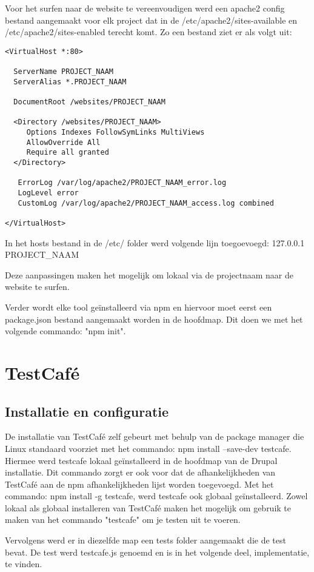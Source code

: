 Voor het surfen naar de website te vereenvoudigen werd een apache2 config bestand aangemaakt voor elk project dat in de /etc/apache2/sites-available en /etc/apache2/sites-enabled terecht komt. Zo een bestand ziet er als volgt uit:  

\begin{lstlisting}
<VirtualHost *:80>

  ServerName PROJECT_NAAM
  ServerAlias *.PROJECT_NAAM

  DocumentRoot /websites/PROJECT_NAAM

  <Directory /websites/PROJECT_NAAM>
     Options Indexes FollowSymLinks MultiViews
     AllowOverride All
     Require all granted
  </Directory>

   ErrorLog /var/log/apache2/PROJECT_NAAM_error.log
   LogLevel error
   CustomLog /var/log/apache2/PROJECT_NAAM_access.log combined
   
</VirtualHost>
\end{lstlisting}

In het hosts bestand in de /etc/ folder werd volgende lijn toegoevoegd: 127.0.0.1   PROJECT\_NAAM

Deze aanpassingen maken het mogelijk om lokaal via de projectnaam naar de website te surfen.

Verder wordt elke tool geïnstalleerd via npm en hiervoor moet eerst een package.json bestand aangemaakt worden in de hoofdmap. Dit doen we met het volgende commando: "npm init".

\section{TestCafé}

\subsection{Installatie en configuratie}
De installatie van TestCafé zelf gebeurt met behulp van de package manager die Linux standaard voorziet met het commando: npm install --save-dev testcafe. Hiermee werd testcafe lokaal geïnstalleerd in de hoofdmap van de Drupal installatie. Dit commando zorgt er ook voor dat de afhankelijkheden van TestCafé aan de npm afhankelijkheden lijst worden toegevoegd. Met het commando: npm install -g testcafe, werd testcafe ook globaal geïnstalleerd. Zowel lokaal als globaal installeren van TestCafé maken het mogelijk om gebruik te maken van het commando "testcafe" om je testen uit te voeren.

Vervolgens werd er in diezelfde map een tests folder aangemaakt die de test bevat. De test werd testcafe.js genoemd en is in het volgende deel, implementatie, te vinden.

